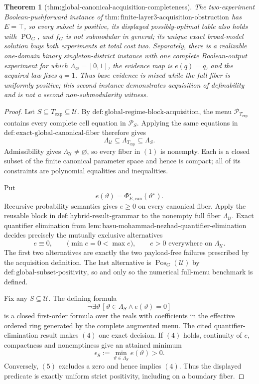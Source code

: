 \documentclass{article}
\newtheorem{theorem}{Theorem}
\begin{document}
\begin{theorem}[thm:global-canonical-acquisition-completeness]
The two-experiment Boolean-pushforward instance of \(\mathrm{thm:finite\text{-}layer3\text{-}acquisition\text{-}obstruction}\) has \(E=\top\), so every subset is positive, its displayed possibly-optimal table also holds with \(\operatorname{PO}_G\), and \(f_G\) is not submodular in general; its unique exact broad-model solution buys both experiments at total cost two.  Separately, there is a realizable one-domain binary singleton-district instance with one complete Boolean-output experiment for which \(\Lambda_{\varnothing}=[0,1]\), the evidence map is \(e(q)=q\), and the acquired law fixes \(q=1\).  Thus base evidence is mixed while the full fiber is uniformly positive; this second instance demonstrates acquisition of definability and is not a second non-submodularity witness.
\end{theorem}
\begin{proof}
Let \(S\subseteq T_{\mathrm{exp}}\subseteq\mathcal U\).  By
\(\mathrm{def:global\text{-}regime\text{-}block\text{-}acquisition}\), the menu
\(\mathcal P_{T_{\mathrm{exp}}}\) contains every complete cell equation in
\(\mathcal P_S\).  Applying the same equations in
\(\mathrm{def:exact\text{-}global\text{-}canonical\text{-}fiber}\) therefore gives
\[
\Lambda_{\mathcal U}\subseteq
\Lambda_{T_{\mathrm{exp}}}\subseteq\Lambda_S.
\tag{1}
\]
Admissibility gives \(\Lambda_{\mathcal U}\ne\varnothing\), so every fiber in
\((1)\) is nonempty.  Each is a closed subset of the finite canonical parameter
space and hence is compact; all of its constraints are polynomial equalities and
inequalities.

Put
\[
e(\vartheta)=
\Phi_{E,\mathrm{can}}^\star(\vartheta^\star).
\tag{2}
\]
Recursive probability semantics gives \(e\geq0\) on every canonical fiber.  Apply
the reusable block in \(\mathrm{def:hybrid\text{-}result\text{-}grammar}\) to the
nonempty full fiber \(\Lambda_{\mathcal U}\).  Exact quantifier elimination from
\(\mathrm{lem:basu\text{-}mohammad\text{-}nezhad\text{-}quantifier\text{-}elimination}\)
decides precisely the mutually exclusive alternatives
\[
 e\equiv0,
\qquad
\bigl(\min e=0<\max e\bigr),
\qquad
e>0\text{ everywhere on }\Lambda_{\mathcal U}.
\tag{3}
\]
The first two alternatives are exactly the two payload-free failures prescribed by
the acquisition definition.  The last alternative is
\(\operatorname{Pos}_G(\mathcal U)\) by
\(\mathrm{def:global\text{-}subset\text{-}positivity}\), so and only so the numerical
full-menu benchmark is defined.

Fix any \(S\subseteq\mathcal U\).  The defining formula
\[
\neg\exists\vartheta\,
\left[\vartheta\in\Lambda_S\wedge e(\vartheta)=0\right]
\tag{4}
\]
is a closed first-order formula over the reals with coefficients in the effective
ordered ring generated by the complete augmented menu.  The cited
quantifier-elimination result makes \((4)\) one exact decision.  If \((4)\) holds,
continuity of \(e\), compactness and nonemptiness give an attained minimum
\[
\epsilon_S:=\min_{\vartheta\in\Lambda_S}e(\vartheta)>0.
\tag{5}
\]
Conversely, \((5)\) excludes a zero and hence implies \((4)\).  Thus the displayed
predicate is exactly uniform strict positivity, including on a boundary fiber.


\end{proof}
\end{document}
